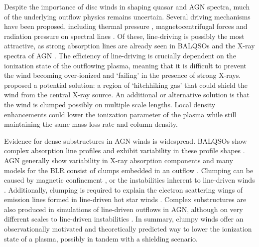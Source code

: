 \documentclass[useAMS,usenatbib]{mn2e_x}
\begin{document}
Despite the importance of disc winds in shaping quasar and AGN spectra,  
much of the underlying outflow physics remains uncertain. 
Several driving mechanisms have been proposed, including
thermal pressure \citep{weymann1982, begelman1991}, magnetocentrifugal forces 
\citep{blandfordpayne,pelletier_pudritz} and 
radiation pressure on spectral lines \citep[`line-driving';][]{lucysolomon1970,shlosman1985,MCGV95}.
Of these, line-driving is possibly the most attractive, as
strong absorption lines are already seen in BALQSOs and the X-ray spectra of AGN 
\citep{reeves2003,poundsreeves2009,tombesi2010a}.
The efficiency of line-driving is crucially dependent on the ionization state 
of the outflowing plasma, meaning that it is difficult to prevent 
the wind becoming over-ionized and `failing' in the presence of strong X-rays. 
\cite{MCGV95} proposed a potential solution: 
a region of `hitchhiking gas' that could shield the wind from the central X-ray source. 
An additional or alternative solution is that the wind is clumped 
\citep[e.g.][]{hamann2013}
possibly on multiple scale lengths. Local density enhancements could lower the 
ionization parameter of the plasma while still maintaining the same mass-loss 
rate and column density. 

Evidence for dense substructures in AGN winds is widespread.
BALQSOs show complex absorption line profiles \citep{ganguly2006, simonhamann2010}
and exhibit variability in these profile shapes \citep{capellupo2011,capellupo2012,capellupo2014}.
AGN generally show variability in X-ray absorption components \citep[e.g.][]{risaliti2002}
and many models for the BLR consist of clumps embedded in an outflow 
\citep{krolik1981, emmering1992, dekool1995, cassidyraine1996}.
Clumping can be caused by magnetic confinement \citep{dekool1995},
or the instabilities inherent to line-driven winds 
\citep{lucysolomon1970,macgregor1979,carlberg1980,owockirybicki1984,owockirybicki1985}.
Additionally, clumping is required to explain the electron scattering wings of emission lines formed
in line-driven hot star winds \citep{hillier1991eswingsmodel}. Complex substructures 
are also produced in simulations of line-driven 
outflows in AGN, although on very different scales to line-driven instabilities 
\citep{PSK2000,PK04,progakurosawa2010,proga2014}.  
In summary, clumpy winds offer an observationally motivated and theoretically 
predicted way to lower the ionization state of a plasma, possibly in tandem
with a shielding scenario. 
\end{document}

